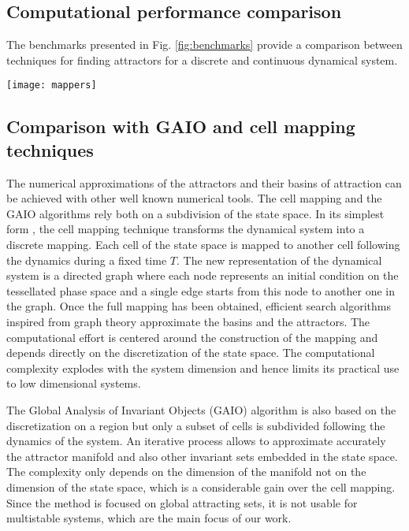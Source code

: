 \documentclass[%
 aip,
 amsmath,amssymb,
 reprint,%
]{revtex4-1}
\begin{document}
\subsection{Computational performance comparison}
The benchmarks presented in Fig. \ref{fig:benchmarks} provide a comparison between techniques for finding attractors for a discrete and continuous dynamical system.
\begin{figure*}[!h]
    \centering
    \texttt{[image: mappers]}
    \caption{Benchmark comparison between all methods for finding attractors and their basins in DynamicalSystems.jl. Note that the featurizing method scales quadratically with the number of initial conditions, because the DBSCAN algorithm scales quadratically.}
    \label{fig:benchmarks}
\end{figure*}


\subsection{Comparison with GAIO and cell mapping techniques}

The numerical approximations of the attractors and their basins of attraction can be achieved with other well known numerical tools. The cell mapping and the GAIO algorithms rely both on a subdivision of the state space. In its simplest form \cite{sun2018cell}, the cell mapping technique transforms the dynamical system into a discrete mapping. Each cell of the state space is mapped to another cell following the dynamics during a fixed time $T$. The new representation of the dynamical system is a directed graph where each node represents an initial condition on the tessellated phase space and a single edge starts from this node to another one in the graph. Once the full mapping has been obtained, efficient search algorithms inspired from graph theory approximate the basins and the attractors. The computational effort is centered around the construction of the mapping and depends directly on the discretization of the state space. The computational complexity explodes with the system dimension and hence limits its practical use to low dimensional systems.

The Global Analysis of Invariant Objects (GAIO) algorithm \cite{dellnitz2001algorithms} is also based on the discretization on a region but only a subset of cells is subdivided following the dynamics of the system. An iterative process allows to approximate accurately the attractor manifold and also other invariant sets embedded in the state space. The complexity only depends on the dimension of the manifold not on the dimension of the state space, which is a considerable gain over the cell mapping. Since the method is focused on global attracting sets, it is not usable for multistable systems, which are the main focus of our work. 
\end{document}
